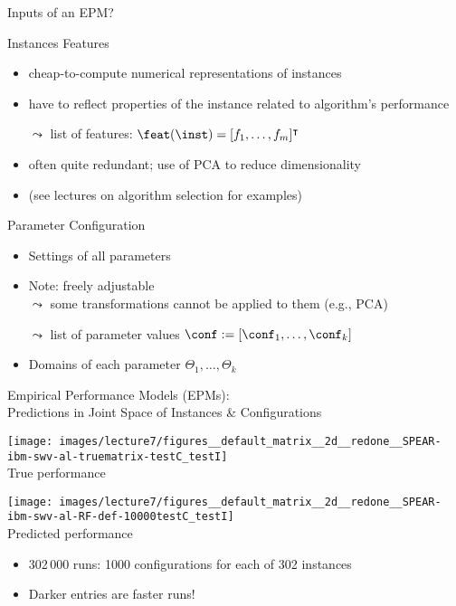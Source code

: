 \begin{frame}[c]{Inputs of an EPM?}

\begin{block}{Instances Features}
\begin{itemize}
  \item cheap-to-compute numerical representations of instances
  \item have to reflect properties of the instance related to algorithm's performance
  \item[$\leadsto$] list of features: $\feat(\inst) = [f_1, \ldots, f_m]^\intercal$ 
  \item often quite redundant; use of PCA to reduce dimensionality
  \item (see lectures on algorithm selection for examples)
\end{itemize}
\end{block}

\pause

\begin{block}{Parameter Configuration}
\begin{itemize}
  \item Settings of all parameters
  \item Note: freely adjustable\\ $\leadsto$ some transformations cannot be applied to them (e.g., PCA)  
  \item[$\leadsto$] list of parameter values $\conf := [\conf_1, \ldots, \conf_k]$
  \item Domains of each parameter $\Theta_1, \ldots, \Theta_k$
\end{itemize}
\end{block}

\end{frame}
\begin{frame}[c]{Empirical Performance Models (EPMs):\\Predictions in
Joint Space of Instances \& Configurations}

\begin{multicols}{2}
\begin{center}
\texttt{[image: images/lecture7/figures\_\_default\_matrix\_\_2d\_\_redone\_\_SPEAR-ibm-swv-al-truematrix-testC\_testI]}\\
True performance
\end{center}
\columnbreak
\begin{center}
\texttt{[image: images/lecture7/figures\_\_default\_matrix\_\_2d\_\_redone\_\_SPEAR-ibm-swv-al-RF-def-10000testC\_testI]}\\
Predicted performance
\end{center}
\end{multicols}

\begin{itemize}  
    \item 302\,000 runs: 1000 configurations for each of 302 instances  
    \item Darker entries are faster runs!
\end{itemize}

\end{frame}
